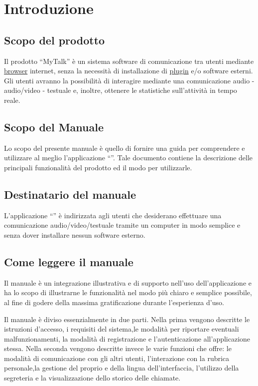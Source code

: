 


\setcounter{page}{1}
\pagestyle{normal}

\section{Introduzione}
\subsection{Scopo del prodotto}
Il prodotto ``MyTalk'' è un sistema software di comunicazione tra utenti mediante \underline{browser} internet, senza la necessità di installazione di \underline{plugin} e/o software esterni. Gli utenti avranno la possibilità di interagire mediante una comunicazione audio - audio/video - testuale e, inoltre, ottenere le statistiche sull'attività in tempo reale.

\subsection{Scopo del Manuale}
Lo scopo del presente manuale è quello di fornire una guida per comprendere e utilizzare al meglio l'applicazione ``\caName''.
Tale documento contiene la descrizione delle principali funzionalità del prodotto ed il modo
per utilizzarle.

\subsection{Destinatario del manuale}
L'applicazione  ``\caName'' è indirizzata agli utenti che desiderano effettuare una comunicazione audio/video/testuale tramite un computer in modo semplice  e senza dover installare nessun software esterno.  

\subsection{Come leggere il manuale}
Il manuale è un integrazione illustrativa e di supporto nell'uso dell'applicazione \caName e ha lo scopo di illustrarne le funzionalità nel modo più chiaro e semplice possibile, al fine di godere della massima gratificazione durante l'esperienza d'uso.

Il manuale è diviso essenzialmente in due parti.
Nella prima vengono descritte le istruzioni d'accesso, i requisiti del sistema,le modalità per riportare eventuali malfunzionamenti, la modalità di registrazione e l'autenticazione all'applicazione stessa. 
Nella seconda vengono descritte invece le varie funzioni che \caName offre: le modalità di comunicazione con gli altri utenti, l'interazione con la rubrica personale,la gestione del proprio \underline{} e della lingua dell'interfaccia, l'utilizzo della segreteria e la visualizzazione dello storico delle chiamate.

